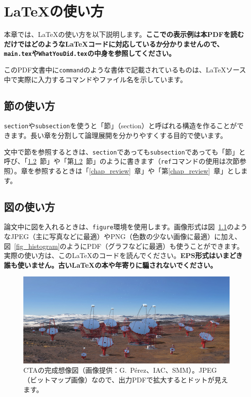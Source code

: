 \chapter{\LaTeX{}の使い方}
本章では、\LaTeX{}の使い方を以下説明します。\textbf{\textsf{ここでの表示例は本PDFを読むだけではどのような\LaTeX{}コードに対応しているか分かりませんので、\texttt{main.tex}や\texttt{WhatYouDid.tex}の中身を参照してください。}}

このPDF文書中に\texttt{command}のような書体で記載されているものは、\LaTeX{}ソース中で実際に入力するコマンドやファイル名を示しています。

\section{節の使い方}
\texttt{\bs{}section}や\texttt{\bs{}subsection}を使うと「節」（section）と呼ばれる構造を作ることができます。長い章を分割して論理展開を分かりやすくする目的で使います。

文中で節を参照するときは、\texttt{section}であっても\texttt{subsection}であっても「節」と呼び、「\ref{sec_figure}~節」や「第\ref{sec_figure}~節」のように書きます（\texttt{ref}コマンドの使用は次節参照）。章を参照するときは「\ref{chap_review}~章」や「第\ref{chap_review}~章」とします。

\section{図の使い方}
\label{sec_figure} %

論文中に図を入れるときは、\texttt{figure}環境を使用します。画像形式は図~\ref{fig_CTA}のようなJPEG（主に写真などに最適）やPNG（色数の少ない画像に最適）に加え、図~\ref{fig_histogram}のようにPDF（グラフなどに最適）も使うことができます。実際の使い方は、この\LaTeX{}のコードを読んでください。\textsf{\textbf{EPS形式はいまどき誰も使いません。古い\LaTeX{}の本や年寄りに騙されないでください。}}

\begin{figure} %
  \centering
  \includegraphics[width=14cm]{fig/CTA.jpg}
  \caption[CTAの完成想像図]{CTAの完成想像図（画像提供：G.~Pérez、IAC、SMM）。JPEG（ビットマップ画像）なので、出力PDFで拡大するとドットが見えます。}
  \label{fig_CTA}
\end{figure}

